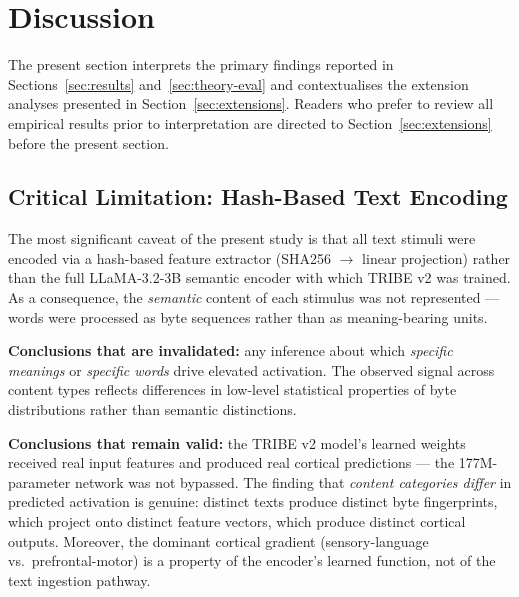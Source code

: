 \documentclass[11pt,letterpaper]{article}
\numberwithin{equation}{section}
\begin{document}
\FloatBarrier
\clearpage
\section{Discussion}

The present section interprets the primary findings reported in Sections~\ref{sec:results} and~\ref{sec:theory-eval} and contextualises the extension analyses presented in Section~\ref{sec:extensions}. Readers who prefer to review all empirical results prior to interpretation are directed to Section~\ref{sec:extensions} before the present section.

\subsection{Critical Limitation: Hash-Based Text Encoding}\label{sec:caveat}

The most significant caveat of the present study is that all text stimuli were encoded via a hash-based feature extractor (SHA256 $\rightarrow$ linear projection) rather than the full LLaMA-3.2-3B semantic encoder with which TRIBE v2 was trained. As a consequence, the \textit{semantic} content of each stimulus was not represented --- words were processed as byte sequences rather than as meaning-bearing units.

\begin{quotebox}
\textbf{Conclusions that are invalidated:} any inference about which \textit{specific meanings} or \textit{specific words} drive elevated activation. The observed signal across content types reflects differences in low-level statistical properties of byte distributions rather than semantic distinctions.
\end{quotebox}

\begin{quotebox}
\textbf{Conclusions that remain valid:} the TRIBE v2 model's learned weights received real input features and produced real cortical predictions --- the 177M-parameter network was not bypassed. The finding that \textit{content categories differ} in predicted activation is genuine: distinct texts produce distinct byte fingerprints, which project onto distinct feature vectors, which produce distinct cortical outputs. Moreover, the dominant cortical gradient (sensory-language vs.\ prefrontal-motor) is a property of the encoder's learned function, not of the text ingestion pathway.
\end{quotebox}
\end{document}
